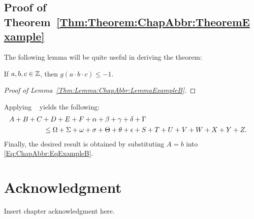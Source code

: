 \subsection{Proof of Theorem~\ref{Thm:Theorem:ChapAbbr:TheoremExample}}

\lipsum[18]

The following lemma will be quite useful in deriving the theorem:

\begin{Thm:Lemma}
\label{Thm:Lemma:ChapAbbr:LemmaExampleB}
If \mbox{$a,b,c\in{\mathbb{Z}}$}, then \mbox{$g(a\cdot b\cdot c) \leq -1$}.
\end{Thm:Lemma}


\begin{proof}
[Proof of Lemma~\ref{Thm:Lemma:ChapAbbr:LemmaExampleB}]
\lipsum[19-20]
\end{proof}


\lipsum[21]
Applying \Lemma~ yields the following:
\begin{align}
& A + B + C + D + E + F
+ \alpha + \beta + \gamma + \delta + \Gamma
\notag
\\
&\hspace{5em}
\leq
\Omega + \Sigma + \omega + \sigma + \Theta + \theta + \epsilon
+ S + T + U + V + W + X + Y + Z.
\label{Eq:ChapAbbr:EqExampleB}
\end{align}
Finally, the desired result is obtained by substituting \mbox{$A=b$} into \eqref{Eq:ChapAbbr:EqExampleB}.
\qedmarker


\EnableTOCUpdates


\section{Acknowledgment}
\label{Section:ChapAbbr:Acknowledgment}

Insert chapter acknowledgment here.
\lipsum[22]
